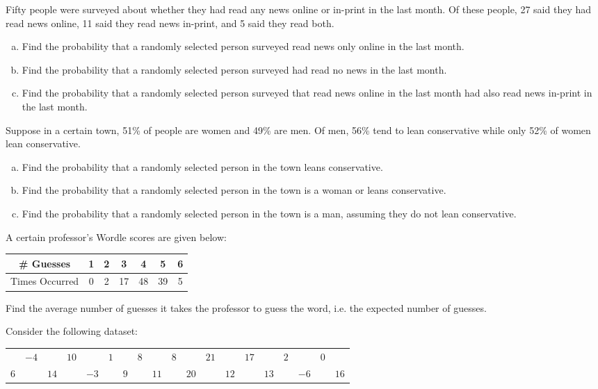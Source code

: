 \documentclass[12pt,letterpaper]{exam}
\begin{document}
\begin{questions}
\newpage
\question[10] Fifty people were surveyed about whether they had read any news online or in-print in the last month. Of these people, 27 said they had read news online, 11 said they read news in-print, and 5 said they read both. 
	\begin{enumerate}[(a)]
	\item Find the probability that a randomly selected person surveyed read news only online in the last month. 
	\item Find the probability that a randomly selected person surveyed had read no news in the last month. 
	\item Find the probability that a randomly selected person surveyed that read news online in the last month had also read news in-print in the last month. 
	\end{enumerate}



\newpage
\question[10] Suppose in a certain town, 51\% of people are women and 49\% are men. Of men, 56\% tend to lean conservative while only 52\% of women lean conservative. 
	\begin{enumerate}[(a)]
	\item Find the probability that a randomly selected person in the town leans conservative. 
	\item Find the probability that a randomly selected person in the town is a woman or leans conservative. 
	\item Find the probability that a randomly selected person in the town is a man, assuming they do not lean conservative. 
	\end{enumerate}



\newpage
\question[10] A certain professor's Wordle scores are given below: \par
	\begin{table}[h]
	\centering
	\begin{tabular}{c||cccccc}
	\# Guesses & 1 & 2 & 3 & 4 & 5 & 6 \\ \hline
	Times Occurred & 0 & 2 & 17 & 48 & 39 & 5 
	\end{tabular}
	\end{table}
Find the average number of guesses it takes the professor to guess the word, i.e. the expected number of guesses. 



\newpage
\question[10] Consider the following dataset: \par
	\begin{table}[h]
	\centering
	\begin{tabular}{rrrrrrrrrrrrrrrrrrr}
	& $-4$ && $10$ && $1$ && $8$ && $8$ && $21$ && $17$ && $2$ && $0$ \\ 
	$6$ && $14$ && $-3$ && $9$ && $11$ && $20$ && $12$ && $13$ && $-6$ && $16$
	\end{tabular}
	\end{table} \par


\end{questions}
\end{document}
